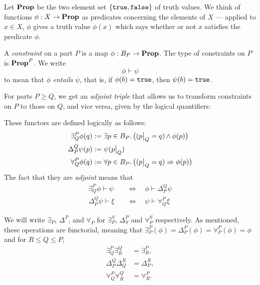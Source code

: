 Let $\operatorname{\textbf{Prop}}$ be the two element set $\{\mathtt{true},\mathtt{false}\}$ of truth values. We think
of functions $\phi : X \to \operatorname{\textbf{Prop}}$ as predicates concerning the elements of $X$
--- applied to $x \in X$, $\phi$ gives a truth value $\phi(x)$ which says
whether or not $x$ satisfies the predicate $\phi$. 
\begin{defn}
A \emph{constraint} on a part $P$ is a map $\phi : B_P \to \operatorname{\textbf{Prop}}$. The type of constraints on $P$ is $\operatorname{\textbf{Prop}}^P$. We write
$$\phi \vdash \psi$$
to mean that $\phi$ \emph{entails} $\psi$, that is, if $\phi(b) = \mathtt{true}$, then $\psi(b) = \mathtt{true}$.
\end{defn}

For parts $P\geq Q$, we get an \emph{adjoint triple} that allows us to transform
constraints on $P$ to those on $Q$, and vice versa, given by the logical quantifiers:
    \begin{center}
    \end{center}
These functors are defined logically as follows:
\begin{align*}
    \exists^P_Q \phi(q) &:= \exists p \in B_P.\, \big((p\big|_{Q} = q) \operatorname{\wedge} \phi(p)\big) \\
    \Delta^Q_P \psi(p) &:= \psi(p\big|_{Q}) \\
    \forall^P_Q \phi(q) &:= \forall p \in B_P.\, \big((p\big|_{Q} = q) \Rightarrow \phi(p)\big)
\end{align*}
The fact that they are \emph{adjoint} means that
\begin{align*}
    \exists^P_Q \phi \vdash \psi\quad &\iff \quad\phi \vdash \Delta^Q_P \psi \\
    \Delta^Q_P \psi \vdash \xi\quad &\iff\quad \psi \vdash \forall^P_Q \xi 
\end{align*}

We will write $\exists_P$, $\Delta^P$, and $\forall_P$ for $\exists^S_P$, $\Delta^P_S$ and $\forall^S_P$ respectively. As mentioned, these operations are functorial, meaning that $\exists^P_P(\phi)=\Delta^P_P(\phi)=\forall^P_P(\phi)=\phi$ and for $R \leq Q \leq P$,
\begin{align*}
    \exists^P_Q \exists^Q_R &= \exists^P_R, \\
    \Delta^Q_P \Delta^R_Q &= \Delta^R_P, \\
    \forall^P_Q \forall^Q_R &= \forall^P_R.
\end{align*}

